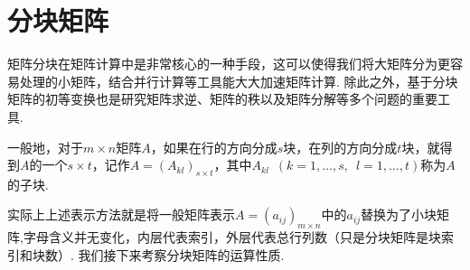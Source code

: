 \section{分块矩阵} \label{sec:分块矩阵}

矩阵分块在矩阵计算中是非常核心的一种手段，这可以使得我们将大矩阵分为更容易处理的小矩阵，结合并行计算等工具能大大加速矩阵计算. 除此之外，基于分块矩阵的初等变换也是研究矩阵求逆、矩阵的秩以及矩阵分解等多个问题的重要工具.

\begin{definition}{}{}
    一般地，对于$m \times n$矩阵$A$，如果在行的方向分成$s$块，在列的方向分成$t$块，就得到$A$的一个$s \times t$，记作$A=(A_{kl})_{s \times t}$，其中$A_{kl}\enspace(k=1,\ldots,s,\enspace l=1,\ldots,t)$称为$A$的子块.
\end{definition}
实际上上述表示方法就是将一般矩阵表示$A=(a_{ij})_{m \times n}$中的$a_{ij}$替换为了小块矩阵,字母含义并无变化，内层代表索引，外层代表总行列数（只是分块矩阵是块索引和块数）. 我们接下来考察分块矩阵的运算性质.
